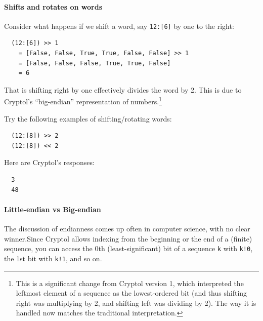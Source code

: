\paragraph*{Shifts and rotates on words} Consider what happens if we
shift a word, say {\tt 12:[6]} by one to the right:
\indShiftLeft\indShiftRight\indRotLeft\indRotRight
\begin{Verbatim}
  (12:[6]) >> 1
    = [False, False, True, True, False, False] >> 1
    = [False, False, False, True, True, False]
    = 6
\end{Verbatim}
That is shifting right by one effectively divides the word by 2. This
is due to Cryptol's ``big-endian'' representation of
numbers.\footnote{This is a significant change from Cryptol version 1,
  which interpreted the leftmost element of a sequence as the
  lowest-ordered bit (and thus shifting right was multiplying by 2,
  and shifting left was dividing by 2). The way it is handled now
  matches the traditional
  interpretation.}\indRotLeft\indRotRight\indShiftLeft\indShiftRight

\begin{Exercise}\label{ex:words:6}
Try the following examples of shifting/rotating words:
\begin{Verbatim}
  (12:[8]) >> 2
  (12:[8]) << 2
\end{Verbatim}
\end{Exercise}
\begin{Answer}
Here are Cryptol's responses:
\begin{Verbatim}
  3
  48
\end{Verbatim}
\end{Answer}


\paragraph*{Little-endian vs Big-endian} The discussion of endianness
comes up often in computer science, with no clear
winner.\indEndianness Since Cryptol allows indexing from the beginning
or the end of a (finite) sequence, you can access the 0th
(least-significant) bit of a sequence \texttt{k} with \texttt{k!0}, the 1st bit with
\texttt{k!1}, and so on.\indIndex

